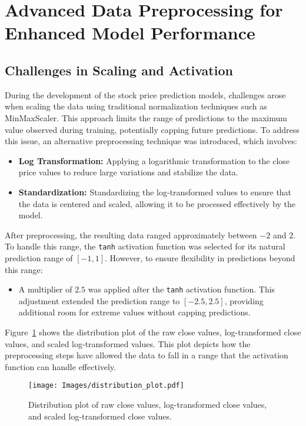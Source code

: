 \section{Advanced Data Preprocessing for Enhanced Model Performance}
\subsection{Challenges in Scaling and Activation}
During the development of the stock price prediction models, challenges arose when scaling the data using traditional normalization techniques such as MinMaxScaler. This approach limits the range of predictions to the maximum value observed during training, potentially capping future predictions. To address this issue, an alternative preprocessing technique was introduced, which involves:
\begin{itemize}
    \item \textbf{Log Transformation:} Applying a logarithmic transformation to the close price values to reduce large variations and stabilize the data.
    \item \textbf{Standardization:} Standardizing the log-transformed values to ensure that the data is centered and scaled, allowing it to be processed effectively by the model.
\end{itemize}

After preprocessing, the resulting data ranged approximately between $-2$ and $2$. To handle this range, the \texttt{tanh} activation function was selected for its natural prediction range of $[-1, 1]$. However, to ensure flexibility in predictions beyond this range:
\begin{itemize}
    \item A multiplier of $2.5$ was applied after the \texttt{tanh} activation function. This adjustment extended the prediction range to $[-2.5, 2.5]$, providing additional room for extreme values without capping predictions.
\end{itemize}

Figure~\ref{fig:distribution_plot} shows the distribution plot of the raw close values, log-transformed close values, and scaled log-transformed values. This plot depicts how the preprocessing steps have allowed the data to fall in a range that the activation function can handle effectively.

\begin{figure}[h]
    \centering
    \texttt{[image: Images/distribution\_plot.pdf]}
    \caption{Distribution plot of raw close values, log-transformed close values, and scaled log-transformed close values.}
    \label{fig:distribution_plot}
\end{figure}

